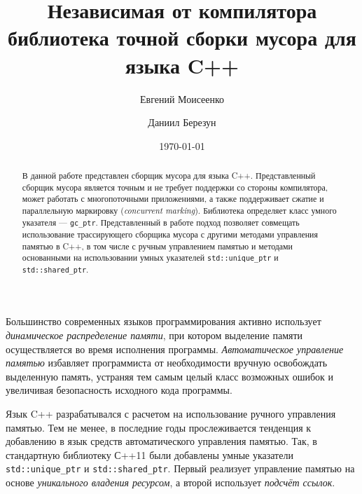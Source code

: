 \documentclass[10pt]{article}
\title{Независимая от компилятора библиотека точной сборки мусора для языка C++}
\author{
        Евгений Моисеенко \\
            \and
        Даниил Березун\\
}
\date{\today}
\newcommand{\code}{\texttt}
\begin{document}
\maketitle

\begin{abstract}
В данной работе представлен сборщик мусора для языка C++.
Представленный сборщик мусора является точным и не требует поддержки со стороны компилятора,
может работать с многопоточными приложениями,
а также поддерживает сжатие и параллельную маркировку (\emph{concurrent marking}).
Библиотека определяет класс умного указателя --- \code{gc\_ptr}.
Представленный в работе подход позволяет совмещать использование 
трассирующего сборщика мусора с другими методами управления памятью в C++, 
в том числе с ручным управлением памятью и методами основанными на использовании
умных указателей \code{std::unique\_ptr} и \code{std::shared\_ptr}. 

\end{abstract}

Большинство современных языков программирования активно использует \emph{динамическое распределение памяти}, 
при котором выделение памяти осуществляется во время исполнения программы. 
\emph{Автоматическое управление памятью} избавляет программиста от необходимости 
вручную освобождать выделенную память, 
устраняя тем самым целый класс возможных ошибок и 
увеличивая безопасность исходного кода программы. 


Язык C++ разрабатывался с расчетом на использование ручного управления памятью.
Тем не менее, в последние годы прослеживается тенденция к добавлению в язык 
средств автоматического управления памятью. 
Так, в стандартную библиотеку С++11 были добавлены 
умные указатели \code{std::unique\_ptr} и \code{std::shared\_ptr}. 
Первый реализует управление памятью на основе \emph{уникального владения ресурсом},
а второй использует \emph{подсчёт ссылок}. 
\end{document}
